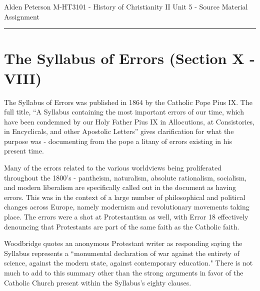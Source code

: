 \documentclass[12pt]{turabian-researchpaper}
\begin{document}
\begin{singlespace}
\noindent Alden Peterson \newline
\noindent M-HT3101 - History of Christianity II\newline
\noindent Unit 5 - Source Material Assignment
\newline\noindent\rule{4cm}{0.4pt}
\end{singlespace}




\section{The Syllabus of Errors (Section X - VIII)}

The Syllabus of Errors was published in 1864 by the Catholic Pope Pius IX.\autocite[pg.625]{woodbridge2013}  The full title, ``A Syllabus containing the most important errors of our time, which have been condemned by our Holy Father Pius IX in Allocutions, at Consistories, in Encyclicals, and other Apostolic Letters'' gives clarification for what the purpose was - documenting from the pope a litany of errors existing in his present time.

Many of the errors related to the various worldviews being proliferated throughout the 1800's - pantheism, naturalism, absolute rationalism, socialism, and modern liberalism are specifically called out in the document as having errors.\autocite[pg.275-277]{bettenson2011documents} This was in the context of a large number of philosophical and political changes across Europe, namely modernism and revolutionary movements taking place.\autocite{woodbridge2013} The errors were a shot at Protestantism as well, with Error 18 effectively denouncing that Protestants are part of the same faith as the Catholic faith.\autocite[pg.625]{woodbridge2013}

Woodbridge quotes an anonymous Protestant writer as responding saying the Syllabus represents a ``monumental declaration of war against the entirety of science, against the modern state, against contemporary education."\autocite[pg.625]{woodbridge2013} There is not much to add to this summary other than the strong arguments in favor of the Catholic Church present within the Syllabus's eighty clauses.
\end{document}
